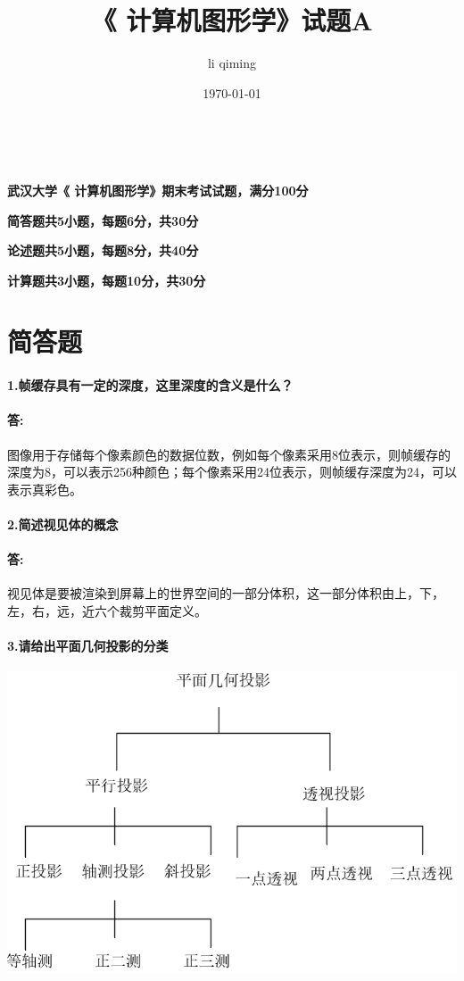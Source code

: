\documentclass[12pt,a4paper,UTF8]{ctexart}
\title{《 计算机图形学》试题A}
\author{li qiming}
\date{\today}
\begin{document}
	\maketitle
	\tableofcontents  %
	~\\  %
	\begin{center}  %
		\par {\bfseries 武汉大学《 计算机图形学》期末考试试题，满分100分}  %
		\par {\bfseries 简答题共5小题，每题6分，共30分}
		\par {\bfseries 论述题共5小题，每题8分，共40分}
		\par {\bfseries 计算题共3小题，每题10分，共30分}
	\end{center}

	\newpage
	
	\section{简答题}
	\paragraph{1.帧缓存具有一定的深度，这里深度的含义是什么？}
	\paragraph{答:}图像用于存储每个像素颜色的数据位数，例如每个像素采用8位表示，则帧缓存的深度为8，可以表示256种颜色；每个像素采用24位表示，则帧缓存深度为24，可以表示真彩色。
	\paragraph{2.简述视见体的概念}
	\paragraph{答:}视见体是要被渲染到屏幕上的世界空间的一部分体积，这一部分体积由上，下，左，右，远，近六个裁剪平面定义。
	\paragraph{3.请给出平面几何投影的分类}
	\begin{center}
		\includegraphics[scale=1.0]{touying.png}
	\end{center}
\end{document}
